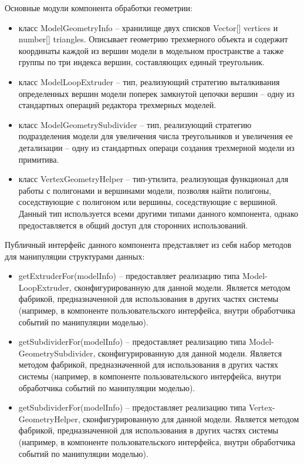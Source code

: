 Основные модули компонента обработки геометрии:
\begin{itemize}
\item класс ModelGeometryInfo -- хранилище двух списков Vector[] vertices и number[] triangles. Описывает геометрию трехмерного объекта и содержит координаты каждой из вершин модели в
модельном пространстве а также группы по три индекса вершин, составляющих единый треугольник.
\item класс ModelLoopExtruder -- тип, реализующий стратегию выталкивания определенных вершин модели поперек замкнутой цепочки вершин -- одну из стандартных операций редактора трехмерных моделей.
\item класс ModelGeometrySubdivider -- тип, реализующий стратегию подразделения модели для увеличения числа треугольников и увеличения ее детализации -- одну из стандартных операци создания
трехмерной модели из примитива.
\item класс VertexGeometryHelper -- тип-утилита, реализующая функционал для работы с полигонами и вершинами модели, позволяя найти полигоны, соседствующие с полигоном или вершины, соседствующие
с вершиной. Данный тип используется всеми другими типами данного компонента, однако предоставляется в общий доступ для сторонних использований.
\end{itemize}

Публичный интерфейс данного компонента представляет из себя набор методов для манипуляции структурами данных:
\begin{itemize}
\item getExtruderFor(modelInfo) -- предоставляет реализацию типа Model-LoopExtruder, сконфигурированную для данной модели. Является методом фабрикой, предназначенной для использования в других
частях системы (например, в компоненте пользовательского интерфейса, внутри обработчика событий по манипуляции моделью).
\item getSubdividerFor(modelInfo) -- предоставляет реализацию типа Model-GeometrySubdivider, сконфигурированную для данной модели. Является методом фабрикой, предназначенной для использования в других
частях системы (например, в компоненте пользовательского интерфейса, внутри обработчика событий по манипуляции моделью).
\item getSubdividerFor(modelInfo) -- предоставляет реализацию типа Vertex-GeometryHelper, сконфигурированную для данной модели. Является методом фабрикой, предназначенной для использования в других
частях системы (например, в компоненте пользовательского интерфейса, внутри обработчика событий по манипуляции моделью).
\end{itemize}


